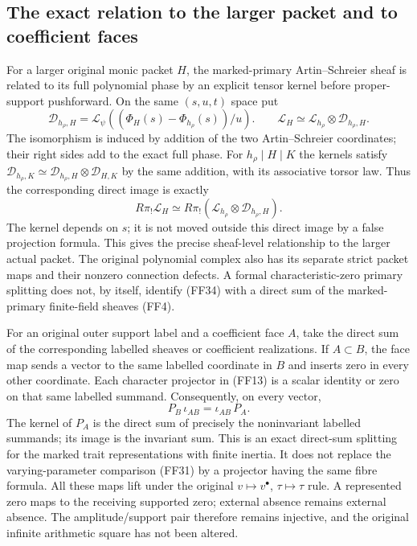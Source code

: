 \documentclass[11pt,a4paper]{article}
\theoremstyle{definition}
\begin{document}
\subsection{The exact relation to the larger packet and to coefficient faces}

For a larger original monic packet \(H\), the marked-primary
Artin--Schreier sheaf is related to its full polynomial phase by
an explicit tensor kernel before proper-support pushforward.
On the same \((s,u,t)\) space put
\[
 \mathcal D_{h_\rho,H}
   =\mathcal L_\psi((\Phi_H(s)-\Phi_{h_\rho}(s))/u).
 \qquad
 \mathcal L_H
    \simeq\mathcal L_{h_\rho}\otimes\mathcal D_{h_\rho,H}.
                                                               \tag{FF33}
\]
The isomorphism is induced by addition of the two
Artin--Schreier coordinates; their right sides add to the exact
full phase.  For \(h_\rho\mid H\mid K\) the kernels satisfy
\(\mathcal D_{h_\rho,K}\simeq
  \mathcal D_{h_\rho,H}\otimes\mathcal D_{H,K}\)
by the same addition, with its associative torsor law.
Thus the corresponding direct image is exactly
\[
       R\pi_!\mathcal L_H
       \simeq R\pi_!
              (\mathcal L_{h_\rho}\otimes\mathcal D_{h_\rho,H}).
                                                               \tag{FF34}
\]
The kernel depends on \(s\); it is not moved outside this
direct image by a false projection formula.
This gives the precise sheaf-level relationship to the larger
actual packet.  The original polynomial complex also has its
separate strict packet maps and their nonzero connection defects.
A formal characteristic-zero primary splitting does not, by
itself, identify (FF34) with a direct sum of the marked-primary
finite-field sheaves (FF4).

For an original outer support label and a coefficient face \(A\),
take the direct sum of the corresponding labelled sheaves or
coefficient realizations.  If \(A\subset B\), the face map sends
a vector to the same labelled coordinate in \(B\) and inserts
zero in every other coordinate.  Each character projector in
(FF13) is a scalar identity or zero on that same labelled
summand.  Consequently, on every vector,
\[
        P_B\,\iota_{AB}=\iota_{AB}\,P_A .               \tag{FF35}
\]
The kernel of \(P_A\) is the direct sum of precisely the
noninvariant labelled summands; its image is the invariant
sum.  This is an exact direct-sum splitting for the marked
trait representations with finite inertia.  It does not
replace the varying-parameter comparison (FF31) by a projector
having the same fibre formula.
All these maps lift under the original
\(v\mapsto v^\bullet\), \(\tau\mapsto\tau\) rule.
A represented zero maps to the receiving supported zero;
external absence remains external absence.
The amplitude/support pair therefore remains injective, and the
original infinite arithmetic square has not been altered.
\end{document}
